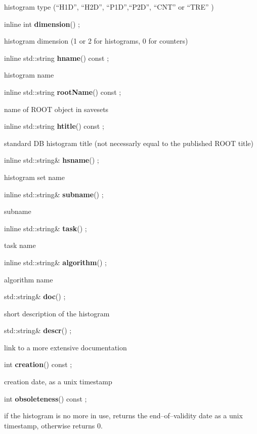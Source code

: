  histogram type (``H1D'', ``H2D'', ``P1D'',``P2D'', ``CNT'' or ``TRE'' )


\item    inline int {\bf dimension}() ;

 histogram dimension (1 or 2 for histograms, 0 for counters)


\item    inline std::string {\bf hname}() const ;

 histogram name


\item    inline std::string {\bf rootName}() const ;

 name of ROOT object in savesets


\item    inline std::string {\bf htitle}() const ;

 standard DB histogram title (not necessarly equal to the published ROOT title)


\item    inline std::string\& {\bf hsname}() ;

 histogram set name


\item    inline std::string\& {\bf subname}() ;

 subname


\item    inline std::string\& {\bf task}() ;

 task name


\item    inline std::string\& {\bf algorithm}() ;

 algorithm name


\item    std::string\& {\bf doc}() ;

 short description of the histogram


\item    std::string\& {\bf descr}() ;

 link to a more extensive documentation


\item    int {\bf creation}() const ;

 creation date, as a unix timestamp


\item    int {\bf obsoleteness}() const ;

 if the histogram is no more in use, returns the end--of--validity date
 as a unix timestamp, otherwise returns 0.


